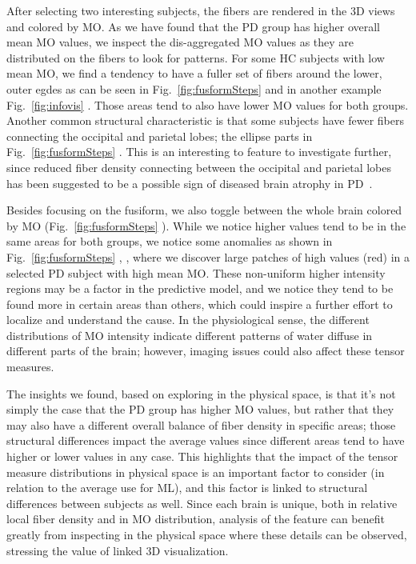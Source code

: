 After selecting two interesting subjects, the fibers are rendered in the 3D views and colored by MO. As we have found that the PD group has higher overall mean MO values, we inspect the dis-aggregated MO values as they are distributed on the fibers to look for patterns. For some HC subjects with low mean MO, we find a tendency to have a fuller set of fibers around the lower, outer egdes as can be seen in Fig.~\ref{fig:fusformSteps}  and in another example Fig.~\ref{fig:infovis} . Those areas tend to also have lower MO values for both groups. Another common structural characteristic is that some subjects have fewer fibers connecting the occipital and parietal lobes; the ellipse parts in Fig.~\ref{fig:fusformSteps} . This is an interesting to feature to investigate further, since reduced fiber density connecting between the occipital and parietal lobes has been suggested to be a possible sign of diseased brain atrophy in PD~\cite{10.1093/brain/awh088}. 

Besides focusing on the fusiform, we also toggle between the whole brain colored by MO (Fig.~\ref{fig:fusformSteps} ). While we notice higher values tend to be in the same areas for both groups, we notice some anomalies as shown in Fig.~\ref{fig:fusformSteps} , , where we discover large patches of high values (red) in a selected PD subject with high mean MO. These non-uniform higher intensity regions may be a factor in the predictive model, and we notice they tend to be found more in certain areas than others, which could inspire a further effort to localize and understand the cause. In the physiological sense, the different distributions of MO intensity indicate different patterns of water diffuse in different parts of the brain; however, imaging issues could also affect these tensor measures.

The insights we found, based on exploring in the physical space, is that it's not simply the case that the PD group has higher MO values, but rather that they may also have a different overall balance of fiber density in specific areas; those structural differences impact the average values since different areas tend to have higher or lower values in any case. This highlights that the impact of the tensor measure distributions in physical space is an important factor to consider (in relation to the average use for ML), and this factor is linked to structural differences between subjects as well. Since each brain is unique, both in relative local fiber density and in MO distribution, analysis of the feature can benefit greatly from inspecting in the physical space where these details can be observed, stressing the value of linked 3D visualization.  


